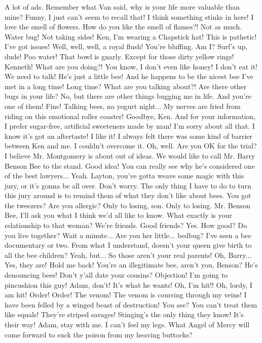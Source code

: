 \documentclass[a4paper,12pt]{article}
\begin{document}
A lot of ads.
Remember what Van said, why is your life more valuable than mine?
Funny, I just can't seem to recall that! I think something stinks in here!
I love the smell of flowers.
How do you like the smell of flames?!
Not as much.
Water bug! Not taking sides!
Ken, I'm wearing a Chapstick hat!
This is pathetic!
I've got issues!
Well, well, well, a royal flush!
You're bluffing.
Am I?
Surf's up, dude!
Poo water!
That bowl is gnarly. Except for those dirty yellow rings!
Kenneth! What are you doing?!
You know, I don't even like honey! I don't eat it!
We need to talk! He's just a little bee!
And he happens to be the nicest bee I've met in a long time!
Long time? What are you talking about?! Are there other bugs in your life?
 No, but there are other things bugging me in life. And you're one of them!
Fine! Talking bees, no yogurt night...
My nerves are fried from riding on this emotional roller coaster!
Goodbye, Ken.
And for your information, I prefer sugar-free, artificial sweeteners made by man!
I'm sorry about all that.
I know it's got an aftertaste! I like it!
I always felt there was some kind of barrier between Ken and me. I couldn't overcome it.
Oh, well.
Are you OK for the trial?
I believe Mr. Montgomery is about out of ideas.
We would like to call Mr. Barry Benson Bee to the stand.
Good idea! You can really see why he's considered one of the best lawyers...
Yeah.
Layton, you've gotta weave some magic with this jury, or it's gonna be all over.
Don't worry. The only thing I have to do to turn this jury around is to remind them of what they don't like about bees.
You got the tweezers?
Are you allergic?
Only to losing, son. Only to losing.
Mr. Benson Bee, I'll ask you what I think we'd all like to know.
What exactly is your relationship to that woman?
We're friends.
Good friends?
Yes.
How good? Do you live together?
Wait a minute... Are you her little... bedbug?
I've seen a bee documentary or two. From what I understand, doesn't your queen give birth to all the bee children?
Yeah, but...
So those aren't your real parents!
Oh, Barry...
Yes, they are!
Hold me back!
You're an illegitimate bee, aren't you, Benson?
He's denouncing bees!
Don't y'all date your cousins?
Objection!
I'm going to pincushion this guy!
Adam, don't! It's what he wants!
Oh, I'm hit!! Oh, lordy, I am hit!
Order! Order!
The venom! The venom is coursing through my veins! I have been felled by a winged beast of destruction! You see? You can't treat them like equals! They're striped savages! Stinging's the only thing they know! It's their way!
Adam, stay with me.
I can't feel my legs.
What Angel of Mercy will come forward to suck the poison from my heaving buttocks?
\end{document}

